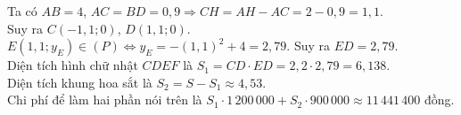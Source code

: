 \begin{ex}
{{\begin{tikzpicture}[scale=0.8,thick,>=stealth, font=\footnotesize, line join=round, line cap=round]
			\end{tikzpicture}
		}
		\noindent
		Ta có $AB=4$, $AC=BD=0{,}9 \Rightarrow CH=AH-AC=2-0{,}9=1{,}1$.\\
		Suy ra $C(-1{,}1;0)$, $D(1{,}1;0)$.\\
		$E(1{,}1;y_E) \in (P) \Leftrightarrow y_E=-(1{,}1)^2+4=2{,}79$.
		Suy ra $ED=2{,}79$.\\
		Diện tích hình chữ nhật $CDEF$ là $S_1=CD\cdot ED=2{,}2\cdot 2{,}79=6{,}138$.\\
		Diện tích khung hoa sắt là $S_2=S-S_1\approx 4{,}53 $.\\
		Chi phí để làm hai phần nói trên là $S_1\cdot 1\,200\,000+ S_2\cdot 900\,000\approx 11\,441\,400 $ đồng.
	}
\end{ex}
